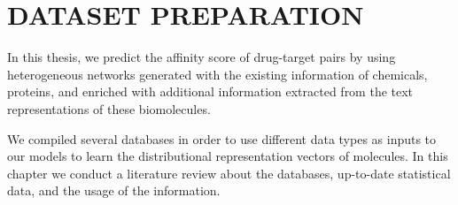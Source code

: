 \chapter{DATASET PREPARATION}
In this thesis, we predict the affinity score of drug-target pairs by using heterogeneous networks generated with the existing information of chemicals, proteins, and enriched with additional information extracted from the text representations of these biomolecules.

We compiled several databases in order to use different data types as inputs to our models to learn the distributional representation vectors of molecules. In this chapter we conduct a literature review about the databases, up-to-date statistical data, and the usage of the information.











